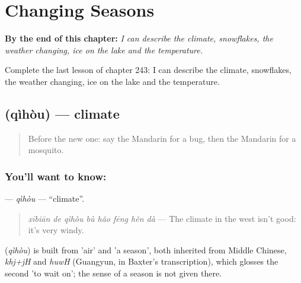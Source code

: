 
\chapter{Changing Seasons}
\label{ch:zh-changing-seasons}

\begin{chapteropening}
\textbf{By the end of this chapter:} \emph{I can describe the climate, snowflakes, the weather changing, ice on the lake and the temperature.}

Complete the last lesson of chapter 243: I can describe the climate, snowflakes, the weather changing, ice on the lake and the temperature.
\end{chapteropening}

\section[\texorpdfstring{\zh{气候} (qìhòu)}{气候 (qìhòu)}]{ (qìhòu) — climate}

\label{lesson:ZH-C243-qihou}



\begin{quote}
Before the new one: say the Mandarin for a bug, then the Mandarin for a mosquito.
\end{quote}

\subsection*{You'll want to know: }
\textbf{} — \emph{qìhòu} — \textquotedblleft{}climate\textquotedblright{}.

\begin{quote}
\textbf{} \emph{xībiān de qìhòu bù hǎo fēng hěn dà} — The climate in the west isn't good: it's very windy.
\end{quote}

\begin{cousinweb}
\textbf{} (\emph{qìhòu}) is built from  'air' and  'a season', both inherited from Middle Chinese, \emph{khj+jH} and \emph{huwH} (Guangyun, in Baxter's transcription), which glosses the second 'to wait on'; the sense of a season is not given there.
\end{cousinweb}

